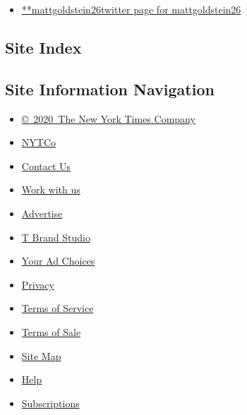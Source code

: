 \begin{itemize}
\tightlist
\item
  \href{https://twitter.com/mattgoldstein26}{**mattgoldstein26twitter
  page for mattgoldstein26}
\end{itemize}

\hypertarget{site-index}{%
\subsection{Site Index}\label{site-index}}

\hypertarget{site-information-navigation}{%
\subsection{Site Information
Navigation}\label{site-information-navigation}}

\begin{itemize}
\tightlist
\item
  \href{https://help.nytimes.com/hc/en-us/articles/115014792127-Copyright-notice}{©~2020~The
  New York Times Company}
\end{itemize}

\begin{itemize}
\tightlist
\item
  \href{https://www.nytco.com/}{NYTCo}
\item
  \href{https://help.nytimes.com/hc/en-us/articles/115015385887-Contact-Us}{Contact
  Us}
\item
  \href{https://www.nytco.com/careers/}{Work with us}
\item
  \href{https://nytmediakit.com/}{Advertise}
\item
  \href{http://www.tbrandstudio.com/}{T Brand Studio}
\item
  \href{https://www.nytimes.com/privacy/cookie-policy\#how-do-i-manage-trackers}{Your
  Ad Choices}
\item
  \href{https://www.nytimes.com/privacy}{Privacy}
\item
  \href{https://help.nytimes.com/hc/en-us/articles/115014893428-Terms-of-service}{Terms
  of Service}
\item
  \href{https://help.nytimes.com/hc/en-us/articles/115014893968-Terms-of-sale}{Terms
  of Sale}
\item
  \href{https://spiderbites.nytimes.com}{Site Map}
\item
  \href{https://help.nytimes.com/hc/en-us}{Help}
\item
  \href{https://www.nytimes.com/subscription?campaignId=37WXW}{Subscriptions}
\end{itemize}

